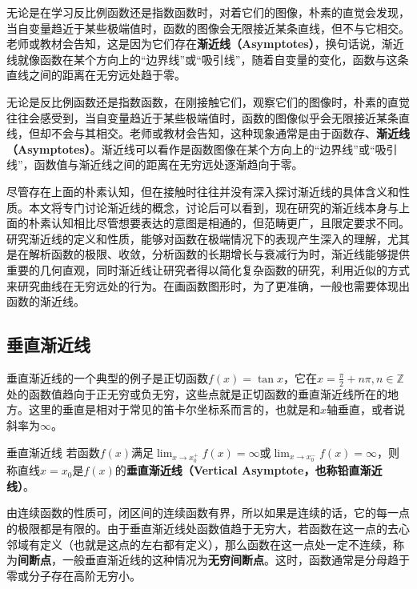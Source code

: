 
\begin{issues}
\issueDraft
\end{issues}

无论是在学习反比例函数还是指数函数时，对着它们的图像，朴素的直觉会发现，当自变量趋近于某些极端值时，函数的图像会无限接近某条直线，但不与它相交。老师或教材会告知，这是因为它们存在\textbf{渐近线（Asymptotes）}，换句话说，渐近线就像函数在某个方向上的“边界线”或“吸引线”，随着自变量的变化，函数与这条直线之间的距离在无穷远处趋于零。

无论是反比例函数还是指数函数，在刚接触它们，观察它们的图像时，朴素的直觉往往会感受到，当自变量趋近于某些极端值时，函数的图像似乎会无限接近某条直线，但却不会与其相交。老师或教材会告知，这种现象通常是由于函数存、\textbf{渐近线（Asymptotes）}。渐近线可以看作是函数图像在某个方向上的“边界线”或“吸引线”，函数值与渐近线之间的距离在无穷远处逐渐趋向于零。

尽管存在上面的朴素认知，但在接触时往往并没有深入探讨渐近线的具体含义和性质。本文将专门讨论渐近线的概念，讨论后可以看到，现在研究的渐近线本身与上面的朴素认知相比尽管想要表达的意图是相通的，但范畴更广，且限定要求不同。研究渐近线的定义和性质，能够对函数在极端情况下的表现产生深入的理解，尤其是在解析函数的极限、收敛，分析函数的长期增长与衰减行为时，渐近线能够提供重要的几何直观，同时渐近线让研究者得以简化复杂函数的研究，利用近似的方式来研究曲线在无穷远处的行为。在画函数图形时，为了更准确，一般也需要体现出函数的渐近线。

\subsection{垂直渐近线}

垂直渐近线的一个典型的例子是正切函数$f(x)=\tan x$，它在$\displaystyle x = \frac{\pi}{2} + n\pi,n \in \mathbb{Z}$处的函数值趋向于正无穷或负无穷，这些点就是正切函数的垂直渐近线所在的地方。这里的垂直是相对于常见的笛卡尔坐标系而言的，也就是和$x$轴垂直，或者说斜率为$\infty$。

\begin{definition}{垂直渐近线}
若函数$f(x)$满足$\displaystyle \lim_{x\to x_0^+}f(x)=\infty$或$\displaystyle \lim_{x\to x_0^-}f(x)=\infty$，则称直线$x=x_0$是$f(x)$的\textbf{垂直渐近线（Vertical Asymptote，也称铅直渐近线）}。
\end{definition}

由连续函数的性质可，闭区间的连续函数有界，所以如果是连续的话，它的每一点的极限都是有限的。由于垂直渐近线处函数值趋于无穷大，若函数在这一点的去心邻域有定义（也就是这点的左右都有定义），那么函数在这一点处一定不连续，称为\textbf{间断点}，一般垂直渐近线的这种情况为\textbf{无穷间断点}。这时，函数通常是分母趋于零或分子存在高阶无穷小。

